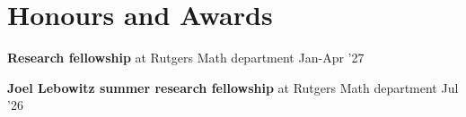 \section{Honours and Awards}
\resumeSubHeadingListStart

\resumeProjectHeading
{\textbf{Research fellowship} at Rutgers Math department}
{Jan-Apr '27}
{}
\vspace{\mygap}

\resumeProjectHeading
{\textbf{Joel Lebowitz summer research fellowship} at Rutgers Math department}
{Jul '26}
{}
\vspace{\mygap}


